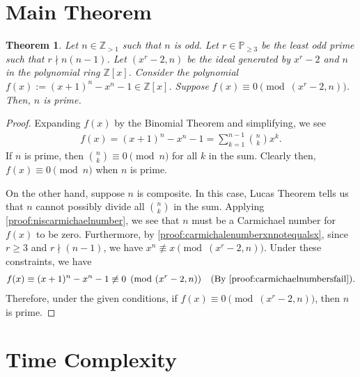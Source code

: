 \documentclass{article}
\theoremstyle{plain}
\newtheorem{theorem}{Theorem}
\theoremstyle{definition}
\newcommand{\Z}{\mathbb{Z}}
\begin{document}
\section{Main Theorem} \label{section:maintheorem}
\begin{theorem} \label{proof:main}
Let $n \in \Z_{>1}$ such that $n$ is odd. Let $r \in \mathbb{P}_{\geq 3}$ be the least odd prime such that $r \nmid n (n-1)$. Let $(x^r-2, n)$ be the ideal generated by $x^r-2$ and $n$ in the polynomial ring $\Z[x]$. Consider the polynomial $f(x) := (x+1)^n - x^n - 1 \in \Z[x]$. Suppose $f(x) \equiv 0 \pmod{(x^r-2, n)}$. Then, $n$ is prime.
\end{theorem}
\begin{proof}
Expanding $f(x)$ by the Binomial Theorem and simplifying, we see
\begin{align*}
    f(x) = (x+1)^n - x^n - 1 = \sum_{k=1}^{n-1} \binom{n}{k} x^k .
\end{align*}
If $n$ is prime, then $\binom{n}{k} \equiv 0 \pmod{n}$ for all $k$ in the sum. Clearly then, $f(x) \equiv 0 \pmod{n}$ when $n$ is prime.

On the other hand, suppose $n$ is composite. In this case, Lucas Theorem tells us that $n$ cannot possibly divide all $\binom{n}{k}$ in the sum. Applying \cref{proof:niscarmichaelnumber}, we see that $n$ must be a Carmichael number for $f(x)$ to be zero. Furthermore,  by \cref{proof:carmichalenumberxnnotequalsx}, since $r \geq 3$ and $r \nmid (n-1)$, we have $x^n \not\equiv x \pmod{(x^r-2,n)}$. Under these constraints, we have
\begin{align*}
    f(x) \equiv (x+1)^n - x^n - 1 \not\equiv 0 \pmod{(x^r-2, n)} \quad \text{(By \cref{proof:carmichaelnumbersfail})} .
\end{align*}
Therefore, under the given conditions, if $f(x) \equiv 0 \pmod{(x^r-2, n)}$, then $n$ is prime.
\end{proof}

\section{Time Complexity}
\end{document}
